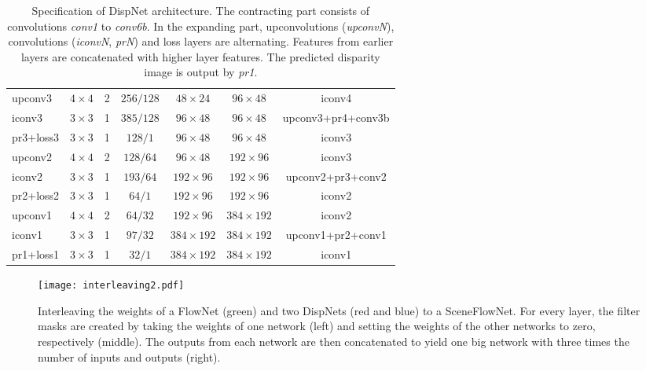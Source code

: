 \documentclass[10pt,twocolumn,letterpaper]{article}
\begin{document}
\begin{table}
\begin{center}
{\begin{tabular}{|l|ccc|cc|c|}
      upconv3 & $4\!\times\!4$ & 2 & $256/128$ & $48\!\times\!24$ & $96\!\times\!48$ & iconv4 \\
      iconv3 & $3\!\times\!3$ & 1 & $385/128$ & $96\!\times\!48$ & $96\!\times\!48$ & upconv3+pr4+conv3b \\
      pr3+loss3 & $3\!\times\!3$ & 1 & $128/1$ & $96\!\times\!48$ & $96\!\times\!48$ & iconv3 \\
      upconv2 & $4\!\times\!4$ & 2 & $128/64$ & $96\!\times\!48$ & $192\!\times\!96$ & iconv3 \\
      iconv2 & $3\!\times\!3$ & 1 & $193/64$ & $192\!\times\!96$ & $192\!\times\!96$ & upconv2+pr3+conv2 \\
      pr2+loss2 & $3\!\times\!3$ & 1 & $64/1$ & $192\!\times\!96$ & $192\!\times\!96$ & iconv2 \\
      upconv1 & $4\!\times\!4$ & 2 & $64/32$ & $192\!\times\!96$ & $384\!\times\!192$ & iconv2 \\
      iconv1 & $3\!\times\!3$ & 1 & $97/32$ & $384\!\times\!192$ & $384\!\times\!192$ & upconv1+pr2+conv1 \\
      pr1+loss1 & $3\!\times\!3$ & 1 & $32/1$ & $384\!\times\!192$ & $384\!\times\!192$ & iconv1 \\
      \hline
    \end{tabular}}
  \end{center}
  \caption{Specification of DispNet architecture. The contracting part consists of convolutions \emph{conv1} to \emph{conv6b}. In the expanding part, upconvolutions (\emph{upconvN}), convolutions (\emph{iconvN}, \emph{prN}) and loss layers are alternating. Features from earlier layers are concatenated with higher layer features. The predicted disparity image is output by \emph{pr1}.}
  \label{table:archs}
\end{table}

\begin{figure}[t]
\begin{center}
  \texttt{[image: interleaving2.pdf]} \\
  \end{center}
  \caption{Interleaving the weights of a FlowNet (green) and two DispNets (red and blue) to a SceneFlowNet. For every layer, the filter masks are created by taking the weights of one network (left) and setting the weights of the other networks to zero, respectively (middle). The outputs from each network are then concatenated to yield one big network with three times the number of inputs and outputs (right).}
  \label{fig:interleaving}
\end{figure}
\end{document}
